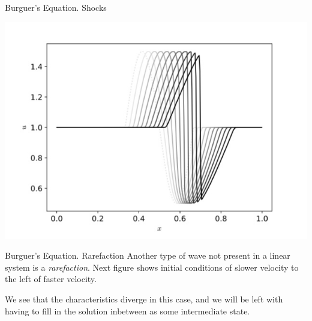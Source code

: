 \documentclass[11pt]{beamer}
\begin{document}
\begin{frame}[fragile]{Burguer's Equation. Shocks}
\begin{center}
\includegraphics[scale=0.3]{burguershock}
\end{center}
\end{frame}

\begin{frame}[fragile]{Burguer's Equation. Rarefaction}
Another type of wave not present in a linear system is a {\em
  rarefaction}.  Next figure shows initial
conditions of slower velocity to the left of faster velocity. 
\bigskip

 We see
that the characteristics diverge in this case, and we will be left
with having to fill in the solution inbetween as some intermediate
state.
\end{frame}
\end{document}
